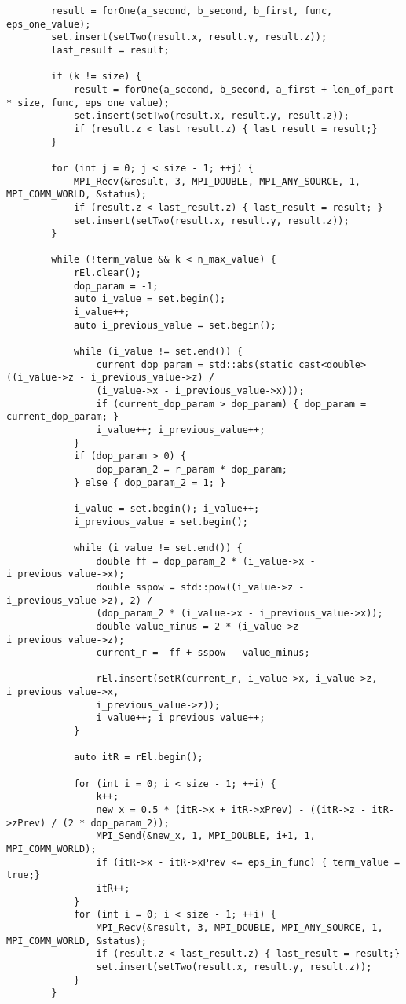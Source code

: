 \documentclass{report}
\begin{document}
\begin{lstlisting}
        result = forOne(a_second, b_second, b_first, func, eps_one_value);
        set.insert(setTwo(result.x, result.y, result.z));
        last_result = result;

        if (k != size) {
            result = forOne(a_second, b_second, a_first + len_of_part * size, func, eps_one_value);
            set.insert(setTwo(result.x, result.y, result.z));
            if (result.z < last_result.z) { last_result = result;}
        }

        for (int j = 0; j < size - 1; ++j) {
            MPI_Recv(&result, 3, MPI_DOUBLE, MPI_ANY_SOURCE, 1, MPI_COMM_WORLD, &status);
            if (result.z < last_result.z) { last_result = result; }
            set.insert(setTwo(result.x, result.y, result.z));
        }

        while (!term_value && k < n_max_value) {
            rEl.clear();
            dop_param = -1;
            auto i_value = set.begin();
            i_value++;
            auto i_previous_value = set.begin();

            while (i_value != set.end()) {
                current_dop_param = std::abs(static_cast<double>((i_value->z - i_previous_value->z) /
                (i_value->x - i_previous_value->x)));
                if (current_dop_param > dop_param) { dop_param = current_dop_param; }
                i_value++; i_previous_value++;
            }
            if (dop_param > 0) {
                dop_param_2 = r_param * dop_param;
            } else { dop_param_2 = 1; }

            i_value = set.begin(); i_value++;
            i_previous_value = set.begin();

            while (i_value != set.end()) {
                double ff = dop_param_2 * (i_value->x - i_previous_value->x);
                double sspow = std::pow((i_value->z - i_previous_value->z), 2) /
                (dop_param_2 * (i_value->x - i_previous_value->x));
                double value_minus = 2 * (i_value->z - i_previous_value->z);
                current_r =  ff + sspow - value_minus;

                rEl.insert(setR(current_r, i_value->x, i_value->z, i_previous_value->x,
                i_previous_value->z));
                i_value++; i_previous_value++;
            }

            auto itR = rEl.begin();

            for (int i = 0; i < size - 1; ++i) {
                k++;
                new_x = 0.5 * (itR->x + itR->xPrev) - ((itR->z - itR->zPrev) / (2 * dop_param_2));
                MPI_Send(&new_x, 1, MPI_DOUBLE, i+1, 1, MPI_COMM_WORLD);
                if (itR->x - itR->xPrev <= eps_in_func) { term_value = true;}
                itR++;
            }
            for (int i = 0; i < size - 1; ++i) {
                MPI_Recv(&result, 3, MPI_DOUBLE, MPI_ANY_SOURCE, 1, MPI_COMM_WORLD, &status);
                if (result.z < last_result.z) { last_result = result;}
                set.insert(setTwo(result.x, result.y, result.z));
            }
        }



\end{lstlisting}
\end{document}

